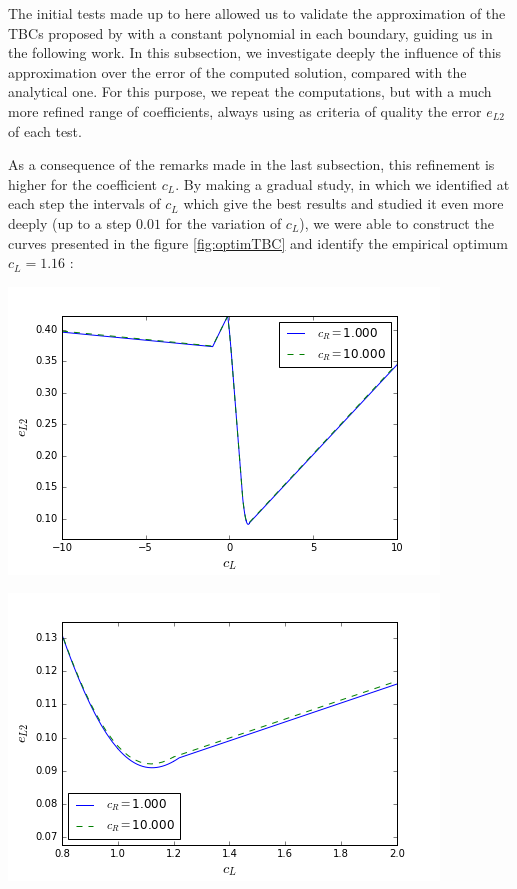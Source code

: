 \indent The initial tests made up to here allowed us to validate the approximation of the TBCs proposed by \cite{besse2015} with a constant polynomial in each boundary, guiding us in the following work. In this subsection, we investigate deeply the influence of this approximation over the error of the computed solution, compared with the analytical one. For this purpose, we repeat the computations, but with a much more refined range of coefficients, always using as criteria of quality the error $e_{L2}$ of each test.

\indent As a consequence of the remarks made in the last subsection, this refinement is higher for the coefficient $c_L$. By making a gradual study, in which we identified at each step the intervals of $c_L$ which give the best results and studied it even more deeply (up to a step $0.01$ for the variation of $c_L$), we were able to construct the curves presented in the figure \ref{fig:optimTBC} and identify the empirical optimum $c_L = 1.16$ :

\begin{minipage}{.5\linewidth}
	\includegraphics[scale=.45]{figures/errorOptimOnlyL2.png}
\end{minipage}
\begin{minipage}{.5\linewidth}
	\includegraphics[scale=.45]{figures/errorOptimOnlyL2Detail.png}
\end{minipage}
